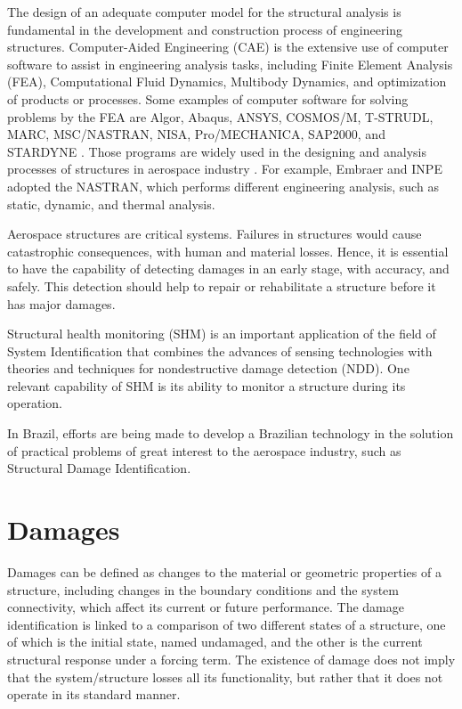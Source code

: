 The design of an adequate computer model for the structural analysis is fundamental in the development and construction process of engineering structures.  Computer-Aided Engineering (CAE) is the extensive use of computer software to assist in engineering analysis tasks, including Finite Element Analysis (FEA), Computational Fluid Dynamics, Multibody Dynamics, and optimization of products or processes. Some examples of computer software for solving problems by the FEA are Algor, Abaqus, ANSYS, COSMOS/M, T-STRUDL, MARC, MSC/NASTRAN, NISA, Pro/MECHANICA, SAP2000, and STARDYNE \cite{logan2011first}. Those programs are widely used in the designing and analysis processes of structures in aerospace industry \cite{Birtles1983}. For example, Embraer and INPE adopted the NASTRAN, which performs different engineering analysis, such as static, dynamic, and thermal analysis.

Aerospace structures are critical systems. Failures in structures would cause catastrophic consequences, with human and material losses. Hence, it is essential to have the capability of detecting damages in an early stage, with accuracy, and safely. This detection should help to repair or rehabilitate a structure before it has major damages.

Structural health monitoring (SHM) is an important application of the field of System Identification that combines the advances of sensing technologies with theories and techniques for nondestructive damage detection (NDD). One relevant capability of SHM is its ability to monitor a structure during its operation. 

In Brazil, efforts are being made to develop a Brazilian technology in the solution of practical problems of great interest to the aerospace industry, such as Structural Damage Identification.

\section{Damages}

Damages can be defined as changes to the material or geometric properties of a structure, including changes in the boundary conditions and the system connectivity, which affect its current or future performance. The damage identification is linked to a comparison of two different states of a structure, one of which is the initial state, named undamaged, and the other is the current structural response under a forcing term. The existence of damage does not imply that the system/structure losses all its functionality, but rather that it does not operate in its standard manner.

